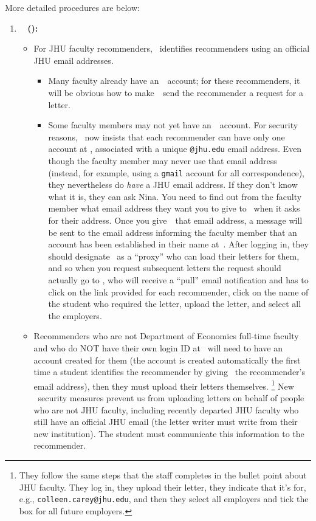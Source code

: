 \documentclass{econtex}
\begin{document}
More detailed procedures are below:
\begin{enumerate}

\item {\bf \EJM ~ (\EJMLink):}
\begin{itemize}
\item For JHU faculty recommenders, \EJM~identifies recommenders using
  an official JHU email addresses.  

\begin{itemize}
\item Many faculty already have an~\EJM~account; for these
  recommenders, it will be obvious how to make~\EJM~send the
  recommender a request for a letter.

\item Some faculty members may not yet have an~\EJM~account.  
For security reasons, \EJM~now insists that each
  recommender can have only one account at \EJM, associated with a
  unique \texttt{@jhu.edu} email address.  Even though the faculty member may never use
  that email address (instead, for example, using a \texttt{gmail}
  account for all correspondence), they nevertheless do {\it have} a
  JHU email address.  If they don't know what it is, they can ask
  Nina.  You need to find out from the faculty member what email
  address they want you to give to \EJM~when it asks for their address.  Once you
  give~\EJM~that email address, a message will be sent to the email
  address informing the faculty member that an account has been
  established in their name at~\EJM.  After logging in, they should
  designate \JMStaffEmail~as a ``proxy'' who can load their letters
  for them, and so when you request subsequent letters the request should
  actually go to \JMStaffEmail, who will receive a ``pull'' email
  notification and has to click on the link provided for each
  recommender, click on the name of the student who required the
  letter, upload the letter, and select all the employers.

\end{itemize}


\item Recommenders who are not Department of Economics full-time faculty and who do NOT have their own
login ID at \EJM~will need to have an account created for them (the account is created automatically the first time a student identifies the recommender by giving \EJM~the recommender's email address), then they must upload their letters themselves. \footnote{They follow the same steps that the
    staff completes in the bullet point about JHU faculty.  They
    log in, they upload their letter, they indicate that it's for, e.g.,
    \texttt{colleen.carey@jhu.edu}, and then they select all employers and tick the box for all
    future employers.}
New \EJM~security measures prevent us from uploading letters on behalf of people
who are not JHU faculty, including recently departed JHU faculty who still have an official JHU email (the letter writer must write from their new institution).  The student must communicate this information to
  the recommender.


\end{itemize}
\end{enumerate}
\end{document}
